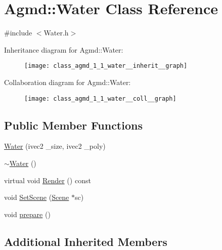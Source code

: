 \hypertarget{class_agmd_1_1_water}{\section{Agmd\+:\+:Water Class Reference}
\label{class_agmd_1_1_water}
}


{\ttfamily \#include $<$Water.\+h$>$}



Inheritance diagram for Agmd\+:\+:Water\+:\nopagebreak
\begin{figure}[H]
\begin{center}
\leavevmode
\texttt{[image: class\_agmd\_1\_1\_water\_\_inherit\_\_graph]}
\end{center}
\end{figure}


Collaboration diagram for Agmd\+:\+:Water\+:\nopagebreak
\begin{figure}[H]
\begin{center}
\leavevmode
\texttt{[image: class\_agmd\_1\_1\_water\_\_coll\_\_graph]}
\end{center}
\end{figure}
\subsection*{Public Member Functions}
\begin{DoxyCompactItemize}
\item 
\hyperlink{class_agmd_1_1_water_a2c58ae33c32399db1b33ea211e33b7fe}{Water} (ivec2 \+\_\+size, ivec2 \+\_\+poly)
\item 
\hyperlink{class_agmd_1_1_water_af2be5c5362d71d6829d53b0e5153b5b5}{$\sim$\+Water} ()
\item 
virtual void \hyperlink{class_agmd_1_1_water_ae7082c0a64de76be28da4c7835e8e73b}{Render} () const 
\item 
void \hyperlink{class_agmd_1_1_water_a96ecfa8c029e3234ac6a0f50f64ad609}{Set\+Scene} (\hyperlink{class_agmd_1_1_scene}{Scene} $\ast$sc)
\item 
void \hyperlink{class_agmd_1_1_water_aa4a5dd9f4e8757586652ba00f8ec6c49}{prepare} ()
\end{DoxyCompactItemize}
\subsection*{Additional Inherited Members}


